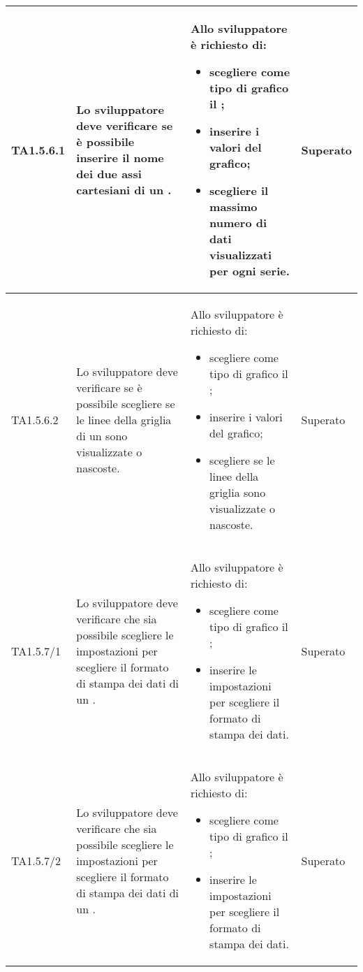 \begin{longtabu}{| X[0.5] | X | X | X[0.5] |}
	TA1.5.6.1 & Lo sviluppatore deve verificare se è possibile inserire il nome dei due assi cartesiani di un .

		& Allo sviluppatore è richiesto di:
		\begin{itemize}
			\item scegliere come tipo di grafico il ;
			\item inserire i valori del grafico;
			\item scegliere il massimo numero di dati visualizzati per ogni serie.
		\end{itemize}
& Superato \\ \hline

	TA1.5.6.2 & Lo sviluppatore deve verificare se è possibile scegliere se le linee della griglia di un  sono visualizzate o nascoste.

		& Allo sviluppatore è richiesto di:
		\begin{itemize}
			\item scegliere come tipo di grafico il ;
			\item inserire i valori del grafico;
			\item scegliere se le linee della griglia sono visualizzate o nascoste.
		\end{itemize}
& Superato \\ \hline

	TA1.5.7/1 & Lo sviluppatore deve verificare che sia possibile scegliere le impostazioni per scegliere il formato di stampa dei dati di un .

		& Allo sviluppatore è richiesto di:
		\begin{itemize}
			\item scegliere come tipo di grafico il ;
			\item inserire le impostazioni per scegliere il formato di stampa dei dati.
		\end{itemize}
& Superato \\ \hline

	TA1.5.7/2 & Lo sviluppatore deve verificare che sia possibile scegliere le impostazioni per scegliere il formato di stampa dei dati di un .

		& Allo sviluppatore è richiesto di:
		\begin{itemize}
			\item scegliere come tipo di grafico il ;
			\item inserire le impostazioni per scegliere il formato di stampa dei dati.
		\end{itemize}
& Superato \\ \hline


\end{longtabu}
